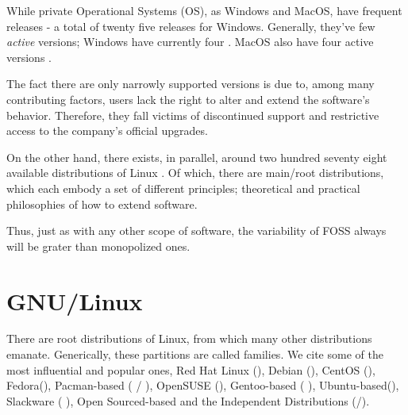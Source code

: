 \documentclass[
12pt,				%
openright,			%
oneside,			%
a4paper,			%
brazil,				%
english,			%
]{abntex2}
\begin{document}
While private Operational Systems (OS), as Windows and MacOS, have
frequent releases - a total of twenty five releases for
Windows. Generally, they've few \textit{active} versions; Windows have
currently four \cite{wikipedia_2021W}. MacOS also have four active
versions \cite{wikipedia_2021Mac}.


The fact there are only narrowly supported versions is due to, among
many contributing factors, users lack the right to alter and extend
the software's behavior. Therefore, they fall victims of discontinued
support and restrictive access to the company's official upgrades. 

On the other hand, there exists, in parallel, around two hundred
seventy eight available distributions of Linux
\cite{wikipedia_2021Linux}. Of which, there are main/root
distributions, which each embody a set of different principles; theoretical and practical philosophies of how to extend software.  

Thus, just as with any other scope of software, the variability of
FOSS always will be grater than monopolized ones.

\section{GNU/Linux}
There are root distributions of Linux, from which many other
distributions emanate. Generically, these partitions are called
families. We cite some of the most influential and popular ones, Red
Hat Linux (), Debian ({}), CentOS
(), Fedora(), Pacman-based
({} /{} ), OpenSUSE (),
Gentoo-based ({}{} ), Ubuntu-based(),
Slackware ({}{} ), Open Sourced-based and the
Independent Distributions ({}/).
\end{document}
